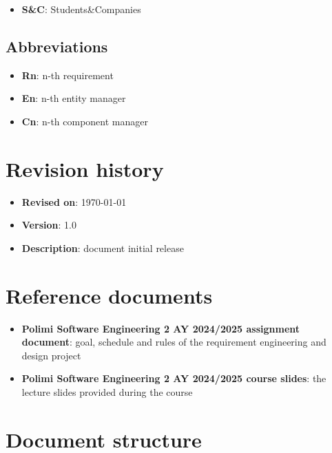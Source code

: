 \begin{itemize}
    \item \textbf{S\&C}: Students\&Companies
\end{itemize}

\subsection{Abbreviations}

\begin{itemize}
    \item \textbf{Rn}: n-th requirement
    \item \textbf{En}: n-th entity manager
    \item \textbf{Cn}: n-th component manager
\end{itemize}

\section{Revision history}

\begin{itemize}
    \item \textbf{Revised on}: \today
    \item \textbf{Version}: 1.0
    \item \textbf{Description}: document initial release
\end{itemize}

\section{Reference documents}

\begin{itemize}
    \item \textbf{Polimi Software Engineering 2 AY 2024/2025 assignment document}: goal, schedule and rules of the requirement engineering and design project
    \item \textbf{Polimi Software Engineering 2 AY 2024/2025 course slides}: the lecture slides provided during the course
\end{itemize}

\section{Document structure}

